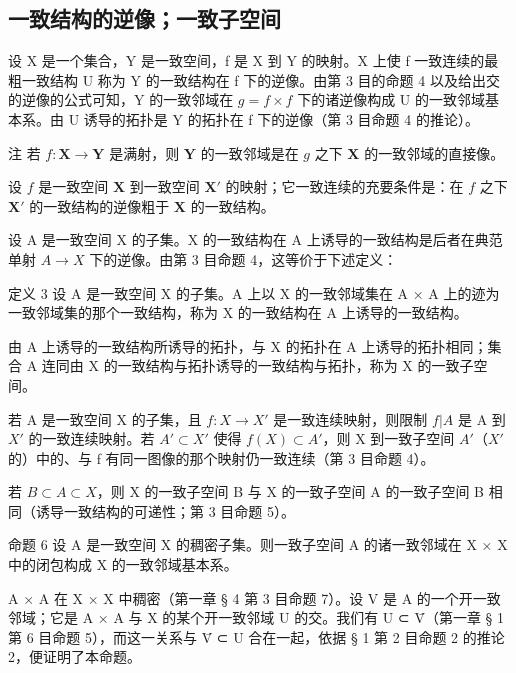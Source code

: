 \subsection{一致结构的逆像；一致子空间}

设 X 是一个集合，Y 是一致空间，f 是 X 到 Y 的映射。X 上使 f 一致连续的最粗一致结构 U 称为 Y 的一致结构在 f 下的逆像。由第 3 目的命题 4 以及给出交的逆像的公式可知，Y 的一致邻域在 \(g = f \times f\) 下的诸逆像构成 U 的一致邻域基本系。由 U 诱导的拓扑是 Y 的拓扑在 f 下的逆像（第 3 目命题 4 的推论）。

注 若 \(f: \mathbf{X} \to \mathbf{Y}\) 是满射，则 \(\mathbf{Y}\) 的一致邻域是在 \(g\) 之下 \(\mathbf{X}\) 的一致邻域的直接像。

设 \(f\) 是一致空间 \(\mathbf{X}\) 到一致空间 \(\mathbf{X}'\) 的映射；它一致连续的充要条件是：在 \(f\) 之下 \(\mathbf{X}'\) 的一致结构的逆像粗于 \(\mathbf{X}\) 的一致结构。

设 A 是一致空间 X 的子集。X 的一致结构在 A 上诱导的一致结构是后者在典范单射 \(A \rightarrow X\) 下的逆像。由第 3 目命题 4，这等价于下述定义：

定义 3 设 A 是一致空间 X 的子集。A 上以 X 的一致邻域集在 A × A 上的迹为一致邻域集的那个一致结构，称为 X 的一致结构在 A 上诱导的一致结构。

由 A 上诱导的一致结构所诱导的拓扑，与 X 的拓扑在 A 上诱导的拓扑相同；集合 A 连同由 X 的一致结构与拓扑诱导的一致结构与拓扑，称为 X 的一致子空间。

若 A 是一致空间 X 的子集，且 \(f: X \to X'\) 是一致连续映射，则限制 \(f|A\) 是 A 到 \(X'\) 的一致连续映射。若 \(A' \subset X'\) 使得 \(f(X) \subset A'\)，则 X 到一致子空间 \(A'\)（\(X'\) 的）中的、与 f 有同一图像的那个映射仍一致连续（第 3 目命题 4）。

若 \(B \subset A \subset X\)，则 X 的一致子空间 B 与 X 的一致子空间 A 的一致子空间 B 相同（诱导一致结构的可递性；第 3 目命题 5）。

命题 6 设 A 是一致空间 X 的稠密子集。则一致子空间 A 的诸一致邻域在 X × X 中的闭包构成 X 的一致邻域基本系。

A × A 在 X × X 中稠密（第一章 § 4 第 3 目命题 7）。设 V 是 A 的一个开一致邻域；它是 A × A 与 X 的某个开一致邻域 U 的交。我们有 U ⊂ V̄（第一章 § 1 第 6 目命题 5），而这一关系与 V̄ ⊂ U 合在一起，依据 § 1 第 2 目命题 2 的推论 2，便证明了本命题。

